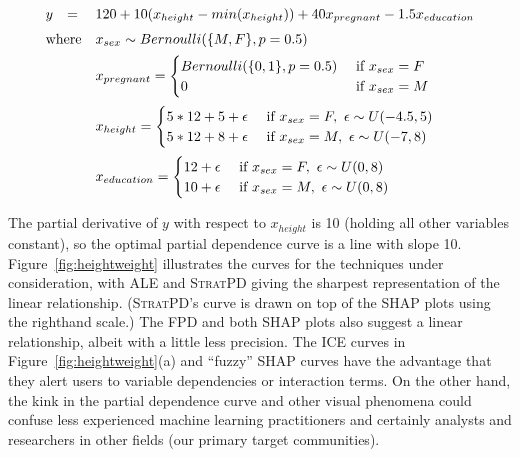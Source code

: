 \documentclass[]{article} %
\newcommand{\figref}[1]{Figure~\ref{#1}}
\newcommand{\spd}{\fontfamily{cmr}\textsc{\small StratPD}}
\begin{document}
\begin{equation}\label{eq:weight}
{
\begin{array}{rll}
y & = &120 + 10(x_{height} - min(x_{height})) + 40x_{pregnant} - 1.5x_{education}\\[2pt]
\vspace{-10pt}\\[2pt]
\multicolumn{2}{r}{\text{where}} & x_{sex} \sim Bernoulli(\{M,F\}, p=0.5)\\[5pt]
                    & & x_{pregnant} = \begin{cases}
                                               Bernoulli(\{0,1\},p=0.5) & \text{ if } x_{sex} = F\\
                                               0 & \text{ if } x_{sex}=M\\
                                               \end{cases}\\[15pt]
                    & & x_{height} = \begin{cases}
                                               5*12+5+ \epsilon & \text{ if } x_{sex}=F,~ \epsilon \sim U(-4.5,5)\\	
                                               5*12+8 + \epsilon & \text{ if } x_{sex}=M,~ \epsilon \sim U(-7,8)\\
                                               \end{cases}\\[15pt]
                    & & x_{education} = \begin{cases}
                                               12 + \epsilon & \text{ if } x_{sex}=F,~ \epsilon \sim U(0,8)\\	
                                               10 + \epsilon & \text{ if } x_{sex}=M,~ \epsilon \sim U(0,8)\\
                                               \end{cases}
\end{array}
}
\end{equation}\vspace{1mm}

\noindent The partial derivative of $y$ with respect to $x_{height}$ is 10 (holding all other variables constant), so the optimal partial dependence curve is a line with slope 10. \figref{fig:heightweight} illustrates the curves for the techniques under consideration, with ALE and \spd{} giving the sharpest representation of the linear relationship. (\spd's curve is drawn on top of the SHAP plots using the righthand scale.) The FPD and both SHAP plots also suggest a linear relationship, albeit with a little less precision. The ICE curves in \figref{fig:heightweight}(a) and ``fuzzy'' SHAP curves have the advantage that they alert users to variable  dependencies or interaction terms.  On the other hand, the kink in the partial dependence curve and other visual phenomena could confuse less experienced machine learning practitioners and certainly analysts and researchers in other fields (our primary target communities).
\end{document}
